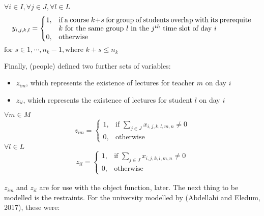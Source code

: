 \documentclass[a4paper, 12pt]{report}
\begin{document}
\begin{math}
	\forall i \in I, \forall j \in J, \forall l \in L
\end{math}
\begin{align}
	y_{i,j,k,l} = 
	\begin{cases}
		1, & \parbox[t]{9.5cm}{if a course $k + s$ for group of students
		overlap with its prerequite $k$ for the same group $l$ in the $j^{th}$
		time slot of day $i$} \\
		0, & \text{otherwise}
	\end{cases}	
\end{align}
\begin{math}
	\text{for } s \in 1, \cdots, n_k - 1, \text{where } k + s \leq n_k	
\end{math}

Finally, (people) defined two further sets of variables:
\begin{itemize}
	\item $z_{im}$, which represents the existence of lectures for teacher $m$
	on day $i$
	\item $z_{il}$, which represents the existence of lectures for student $l$
	on day $i$
\end{itemize}

\begin{math}
	\forall m \in M
\end{math}
\begin{align}
	z_{im} =
	\begin{cases}
		1, & \text{if $\sum_{j \in J} x_{i,j,k,l,m,n} \neq 0$} \\
		0, & \text{otherwise}
	\end{cases}	
\end{align}
\begin{math}
	\forall l \in L
\end{math}
\begin{align}
	z_{il} =
	\begin{cases}
		1, & \text{if $\sum_{j \in J} x_{i,j,k,l,m,n} \neq 0$} \\
		0, & \text{otherwise}
	\end{cases}	
\end{align}

$z_{im}$ and $z_{il}$ are for use with the object function, later. The next
thing to be modelled is the restraints. For the university modelled by
(Abdellahi and Eledum, 2017), these were:
\end{document}
